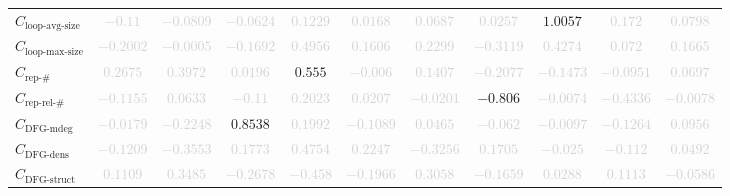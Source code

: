 \documentclass{standalone}
\newcommand{\loopavgsizename}{\text{loop-avg-size}}
\newcommand{\loopavgsize}{C_{\loopavgsizename}}
\newcommand{\loopmaxsizename}{\text{loop-max-size}}
\newcommand{\loopmaxsize}{C_{\loopmaxsizename}}
\newcommand{\repnumname}{\text{rep-\#}}
\newcommand{\repnum}{C_{\repnumname}}
\newcommand{\reprelnumname}{\text{rep-rel-\#}}
\newcommand{\reprelnum}{C_{\reprelnumname}}
\newcommand{\dfgmaxdegname}{\text{DFG-mdeg}}
\newcommand{\dfgmaxdeg}{C_{\dfgmaxdegname}}
\newcommand{\dfgdensname}{\text{DFG-dens}}
\newcommand{\dfgdens}{C_{\dfgdensname}}
\newcommand{\dfgstructname}{\text{DFG-struct}}
\newcommand{\dfgstruct}{C_{\dfgstructname}}
\begin{document}
\begin{tabular}{lcccccccccc}
$\loopavgsize$ & \textcolor{lightgray}{$-0.11$} & \textcolor{lightgray}{$-0.0809$} & \textcolor{lightgray}{$-0.0624$} & \textcolor{lightgray}{$0.1229$} & \textcolor{lightgray}{$0.0168$} & \textcolor{lightgray}{$0.0687$} & \textcolor{lightgray}{$0.0257$} & $1.0057$ & \textcolor{lightgray}{$0.172$} & \textcolor{lightgray}{$0.0798$} \\ 
$\loopmaxsize$ & \textcolor{lightgray}{$-0.2002$} & \textcolor{lightgray}{$-0.0005$} & \textcolor{lightgray}{$-0.1692$} & \textcolor{lightgray}{$0.4956$} & \textcolor{lightgray}{$0.1606$} & \textcolor{lightgray}{$0.2299$} & \textcolor{lightgray}{$-0.3119$} & \textcolor{lightgray}{$0.4274$} & \textcolor{lightgray}{$0.072$} & \textcolor{lightgray}{$0.1665$} \\ 
$\repnum$ & \textcolor{lightgray}{$0.2675$} & \textcolor{lightgray}{$0.3972$} & \textcolor{lightgray}{$0.0196$} & $0.555$ & \textcolor{lightgray}{$-0.006$} & \textcolor{lightgray}{$0.1407$} & \textcolor{lightgray}{$-0.2077$} & \textcolor{lightgray}{$-0.1473$} & \textcolor{lightgray}{$-0.0951$} & \textcolor{lightgray}{$0.0697$} \\ 
$\reprelnum$ & \textcolor{lightgray}{$-0.1155$} & \textcolor{lightgray}{$0.0633$} & \textcolor{lightgray}{$-0.11$} & \textcolor{lightgray}{$0.2023$} & \textcolor{lightgray}{$0.0207$} & \textcolor{lightgray}{$-0.0201$} & $-0.806$ & \textcolor{lightgray}{$-0.0074$} & \textcolor{lightgray}{$-0.4336$} & \textcolor{lightgray}{$-0.0078$} \\ 
$\dfgmaxdeg$ & \textcolor{lightgray}{$-0.0179$} & \textcolor{lightgray}{$-0.2248$} & $0.8538$ & \textcolor{lightgray}{$0.1992$} & \textcolor{lightgray}{$-0.1089$} & \textcolor{lightgray}{$0.0465$} & \textcolor{lightgray}{$-0.062$} & \textcolor{lightgray}{$-0.0097$} & \textcolor{lightgray}{$-0.1264$} & \textcolor{lightgray}{$0.0956$} \\ 
$\dfgdens$ & \textcolor{lightgray}{$-0.1209$} & \textcolor{lightgray}{$-0.3553$} & \textcolor{lightgray}{$0.1773$} & \textcolor{lightgray}{$0.4754$} & \textcolor{lightgray}{$0.2247$} & \textcolor{lightgray}{$-0.3256$} & \textcolor{lightgray}{$0.1705$} & \textcolor{lightgray}{$-0.025$} & \textcolor{lightgray}{$-0.112$} & \textcolor{lightgray}{$0.0492$} \\ 
$\dfgstruct$ & \textcolor{lightgray}{$0.1109$} & \textcolor{lightgray}{$0.3485$} & \textcolor{lightgray}{$-0.2678$} & \textcolor{lightgray}{$-0.458$} & \textcolor{lightgray}{$-0.1966$} & \textcolor{lightgray}{$0.3058$} & \textcolor{lightgray}{$-0.1659$} & \textcolor{lightgray}{$0.0288$} & \textcolor{lightgray}{$0.1113$} & \textcolor{lightgray}{$-0.0586$} \\ 

\end{tabular}
\end{document}

